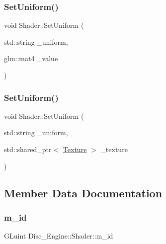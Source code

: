 \subsubsection{\texorpdfstring{Set\+Uniform()}{SetUniform()}\hspace{0.1cm}{\footnotesize\ttfamily [3/4]}}
{\footnotesize\ttfamily void Shader\+::\+Set\+Uniform (\begin{DoxyParamCaption}\item[{std\+::string}]{\+\_\+uniform,  }\item[{glm\+::mat4}]{\+\_\+value }\end{DoxyParamCaption})}

\mbox{\label{class_disc___engine_1_1_shader_a479f29b49b7e1a7326995415c3175c3a}} 
\subsubsection{\texorpdfstring{Set\+Uniform()}{SetUniform()}\hspace{0.1cm}{\footnotesize\ttfamily [4/4]}}
{\footnotesize\ttfamily void Shader\+::\+Set\+Uniform (\begin{DoxyParamCaption}\item[{std\+::string}]{\+\_\+uniform,  }\item[{std\+::shared\+\_\+ptr$<$ \mbox{\hyperlink{class_disc___engine_1_1_texture}{Texture}} $>$}]{\+\_\+texture }\end{DoxyParamCaption})}



\subsection{Member Data Documentation}
\mbox{\label{class_disc___engine_1_1_shader_aada3554645b154451f9da5f7683ab6ef}} 
\subsubsection{\texorpdfstring{m\+\_\+id}{m\_id}}
{\footnotesize\ttfamily G\+Luint Disc\+\_\+\+Engine\+::\+Shader\+::m\+\_\+id\hspace{0.3cm}{\ttfamily [private]}}

